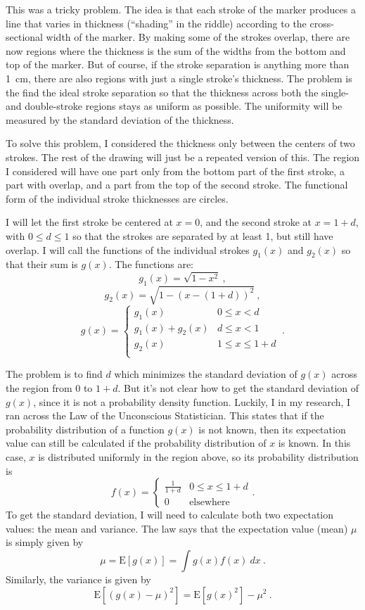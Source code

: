 \documentclass{article}
\begin{document}
This was a tricky problem.
The idea is that each stroke of the marker produces a line that varies in thickness (``shading'' in the riddle) according to the cross-sectional width of the marker.
By making some of the strokes overlap, there are now regions where the thickness is the sum of the widths from the bottom and top of the marker.
But of course, if the stroke separation is anything more than 1~cm, there are also regions with just a single stroke's thickness.
The problem is the find the ideal stroke separation so that the thickness across both the single- and double-stroke regions stays as uniform as possible.
The uniformity will be measured by the standard deviation of the thickness.

To solve this problem, I considered the thickness only between the centers of two strokes.
The rest of the drawing will just be a repeated version of this.
The region I considered will have one part only from the bottom part of the first stroke, a part with overlap, and a part from the top of the second stroke.
The functional form of the individual stroke thicknesses are circles.

I will let the first stroke be centered at $x=0$, and the second stroke at $x=1+d$, with $0\leq d\leq1$ so that the strokes are separated by at least 1, but still have overlap.
I will call the functions of the individual strokes $g_{1}(x)$ and $g_{2}(x)$ so that their sum is $g(x)$.
The functions are:
\[
g_{1}(x)=\sqrt{1-x^{2}}\ ,
\]
\[
g_{2}(x)=\sqrt{1-(x-(1+d))^{2}}\ ,
\]
\[
g(x)=
\begin{cases}
g_{1}(x) & 0\leq x<d \\
g_{1}(x)+g_{2}(x) & d\leq x<1 \\
g_{2}(x) & 1\leq x\leq1+d \\
\end{cases}
\ .
\]

The problem is to find $d$ which minimizes the standard deviation of $g(x)$ across the region from 0 to $1+d$.
But it's not clear how to get the standard deviation of $g(x)$, since it is not a probability density function.
Luckily, I in my research, I ran across the Law of the Unconscious Statistician.
This states that if the probability distribution of a function $g(x)$ is not known, then its expectation value can still be calculated if the probability distribution of $x$ is known.
In this case, $x$ is distributed uniformly in the region above, so its probability distribution is
\[
f(x)=
\begin{cases}
\frac{1}{1+d} & 0\leq x\leq1+d \\
0 & \text{elsewhere}
\end{cases}
.
\]
To get the standard deviation, I will need to calculate both two expectation values: the mean and variance.
The law says that the expectation value (mean) $\mu$ is simply given by
\[
\mu=\text{E}[g(x)]=\int g(x)f(x)\ dx\ .
\]
Similarly, the variance is given by
\[
\text{E}\left[(g(x)-\mu)^{2}\right]=\text{E}\left[g(x)^{2}\right]-\mu^{2}\ .
\]
\end{document}
